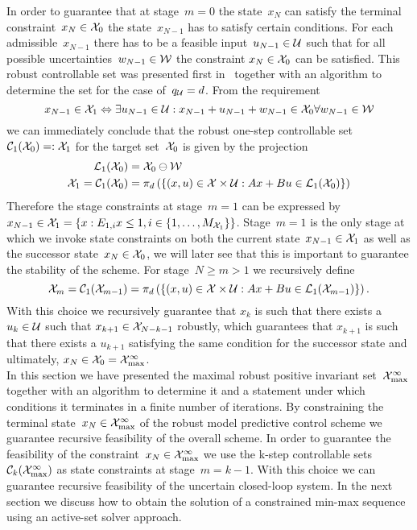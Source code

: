 \noindent\mysplit In order to guarantee that at stage~$m=0$ the state~$x_N$ can satisfy the terminal constraint~$x_N\in\mathcal X_0$ the state~$x_{N-1}$ has to satisfy certain conditions.
%
For each admissible~$x_{N-1}$ there has to be a feasible input~$u_{N-1}\in\mathcal U$ such that for all possible uncertainties~$w_{N-1}\in\mathcal W$ the constraint $x_N\in\mathcal X_0$ can be satisfied.
%
This robust controllable set was presented first in~\cite{Bertsekas:1971} together with an algorithm to determine the set for the case of~$q_\mathcal U=d$.
%
From the requirement 
%
\[
	x_{N-1}\in\mathcal X_1\Leftrightarrow \exists u_{N-1}\in\mathcal U:x_{N-1}+u_{N-1}+w_{N-1}\in\mathcal X_0\forall w_{N-1}\in\mathcal W
\]
%
we can immediately conclude that the robust one-step controllable set~$\mathcal C_1(\mathcal X_0)=:\mathcal X_1$ for the target set~$\mathcal X_0$ is given by the projection
%
\begin{equation}\label{eq:definition:one:step:controllable:set}\begin{aligned}
	\mathcal L_1(\mathcal X_0) &= \mathcal X_0\ominus\mathcal W\\
	\mathcal X_1 = \mathcal C_1(\mathcal X_0) &= \pi_d \left(\{(x,u)\in\mathcal X\times\mathcal U:Ax+Bu\in\mathcal L_1(\mathcal X_0)\}\right)
\end{aligned}\end{equation}
%
Therefore the stage constraints at stage~$m=1$ can be expressed by $x_{N-1}\in\mathcal X_1 = \{x:E_{1,i}x\leq 1,i\in\{1,\dots,M_{\mathcal X_1}\}\}$.
%
Stage~$m=1$ is the only stage at which we invoke state constraints on both the current state~$x_{N-1}\in\mathcal X_1$ as well as the successor state~$x_{N}\in\mathcal X_0$, we will later see that this is important to guarantee the stability of the scheme.
%
For stage~$N\geq m> 1$ we recursively define
%
\begin{equation}
	\mathcal X_m = \mathcal C_1(\mathcal X_{m-1}) = \pi_d \left(\{(x,u)\in\mathcal X\times\mathcal U:Ax+Bu\in\mathcal L_1(\mathcal X_{m-1})\}\right).
\end{equation}
%
With this choice we recursively guarantee that $x_k$ is such that there exists a $u_k\in\mathcal U$ such that $x_{k+1}\in\mathcal X_{N-k-1}$ robustly, which guarantees that $x_{k+1}$ is such that there exists a $u_{k+1}$ satisfying the same condition for the successor state and ultimately, $x_N\in\mathcal X_0=\mathcal X^\infty_{\max}$.
%
\\[1em]
%
In this section we have presented the maximal robust positive invariant set~$\mathcal X_{\max}^\infty$ together with an algorithm to determine it and a statement under which conditions it terminates in a finite number of iterations.
%
By constraining the terminal state~$x_N\in\mathcal X^\infty_{\max}$ of the robust model predictive control scheme we guarantee recursive feasibility of the overall scheme.
%
In order to guarantee the feasibility of the constraint~$x_N\in\mathcal X^\infty_{\max}$ we use the k-step controllable sets $\mathcal C_k(\mathcal X^\infty_{\max})$ as state constraints at stage~$m=k-1$.
%
With this choice we can guarantee recursive feasibility of the uncertain closed-loop system.
%
In the next section we discuss how to obtain the solution of a constrained min-max sequence using an active-set solver approach.


